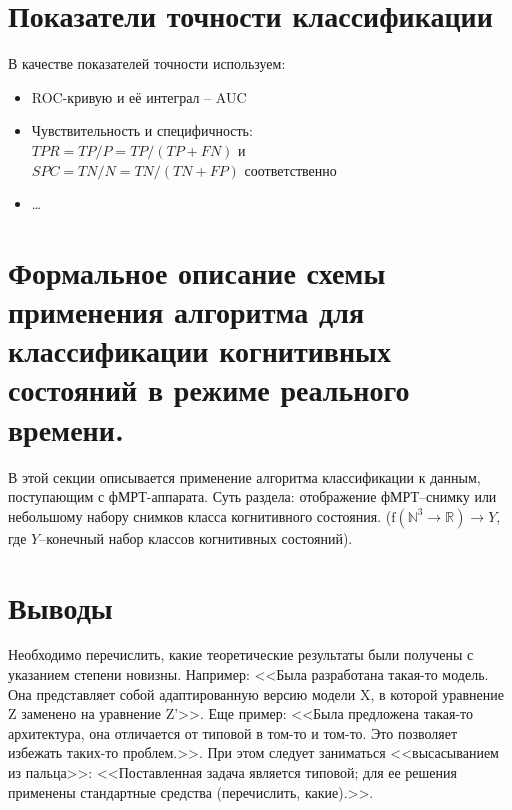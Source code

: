 \section{Показатели точности классификации}
\begin{annotation}
	В качестве показателей точности используем:
	\begin{itemize}
\item ROC-кривую и её интеграл -- AUC
\item Чувствительность и специфичность:\\ ${\mathit {TPR}}={\mathit {TP}}/P={\mathit {TP}}/({\mathit {TP}}+{\mathit {FN}})$ и \\  $ {\mathit {SPC}}={\mathit {TN}}/N={\mathit {TN}}/({\mathit {TN}}+{\mathit {FP}})$ соответственно

\item \ldots
	\end{itemize}
\end{annotation}

\section{Формальное описание схемы применения алгоритма для классификации когнитивных состояний в режиме реального времени.}

\begin{annotation}
	В этой секции описывается применение алгоритма классификации к данным, поступающим с фМРТ-аппарата.
	Суть раздела: отображение фМРТ--снимку или небольшому набору снимков класса когнитивного состояния. ($\mathrm f (\mathbb N^3\to \mathbb R) \to Y$, где $Y$--конечный набор классов когнитивных состояний). 
\end{annotation}

\section{Выводы}

Необходимо перечислить, какие теоретические результаты были получены с указанием степени новизны. Например: <<Была разработана такая-то модель. Она представляет собой адаптированную версию модели X, в которой уравнение Z заменено на уравнение Z'>>. Еще пример: <<Была предложена такая-то архитектура, она отличается от типовой в том-то и том-то. Это позволяет избежать таких-то проблем.>>. При этом следует заниматься <<высасыванием из пальца>>: <<Поставленная задача является типовой; для ее решения применены стандартные средства (перечислить, какие).>>.